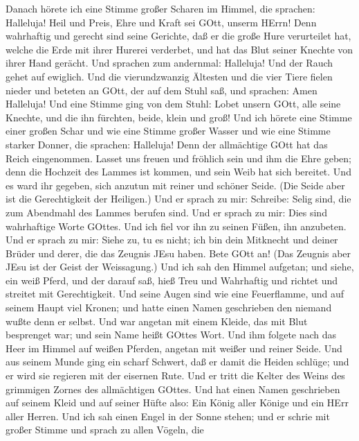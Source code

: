  Danach hörete ich eine Stimme großer Scharen im Himmel, die
sprachen: Halleluja! Heil und Preis, Ehre und Kraft sei GOtt, unserm
HErrn!  Denn wahrhaftig und gerecht sind seine Gerichte, daß
er die große Hure verurteilet hat, welche die Erde mit ihrer Hurerei
verderbet, und hat das Blut seiner Knechte von ihrer Hand gerächt.
 Und sprachen zum andernmal: Halleluja! Und der Rauch gehet
auf ewiglich.  Und die vierundzwanzig Ältesten und die vier
Tiere fielen nieder und beteten an GOtt, der auf dem Stuhl saß, und
sprachen: Amen Halleluja!  Und eine Stimme ging von dem
Stuhl: Lobet unsern GOtt, alle seine Knechte, und die ihn fürchten,
beide, klein und groß!  Und ich hörete eine Stimme einer
großen Schar und wie eine Stimme großer Wasser und wie eine Stimme
starker Donner, die sprachen: Halleluja! Denn der allmächtige GOtt hat
das Reich eingenommen.  Lasset uns freuen und fröhlich sein
und ihm die Ehre geben; denn die Hochzeit des Lammes ist kommen, und
sein Weib hat sich bereitet.  Und es ward ihr gegeben, sich
anzutun mit reiner und schöner Seide. (Die Seide aber ist die
Gerechtigkeit der Heiligen.)  Und er sprach zu mir:
Schreibe: Selig sind, die zum Abendmahl des Lammes berufen sind. Und er
sprach zu mir: Dies sind wahrhaftige Worte GOttes.  Und ich
fiel vor ihn zu seinen Füßen, ihn anzubeten. Und er sprach zu mir: Siehe
zu, tu es nicht; ich bin dein Mitknecht und deiner Brüder und derer, die
das Zeugnis JEsu haben. Bete GOtt an! (Das Zeugnis aber JEsu ist der
Geist der Weissagung.)  Und ich sah den Himmel aufgetan;
und siehe, ein weiß Pferd, und der darauf saß, hieß Treu und Wahrhaftig
und richtet und streitet mit Gerechtigkeit.  Und seine
Augen sind wie eine Feuerflamme, und auf seinem Haupt viel Kronen; und
hatte einen Namen geschrieben den niemand wußte denn er selbst.
 Und war angetan mit einem Kleide, das mit Blut besprenget
war; und sein Name heißt GOttes Wort.  Und ihm folgete nach
das Heer im Himmel auf weißen Pferden, angetan mit weißer und reiner
Seide.  Und aus seinem Munde ging ein scharf Schwert, daß
er damit die Heiden schlüge; und er wird sie regieren mit der eisernen
Rute. Und er tritt die Kelter des Weins des grimmigen Zornes des
allmächtigen GOttes.  Und hat einen Namen geschrieben auf
seinem Kleid und auf seiner Hüfte also: Ein König aller Könige und ein
HErr aller Herren.  Und ich sah einen Engel in der Sonne
stehen; und er schrie mit großer Stimme und sprach zu allen Vögeln, die

